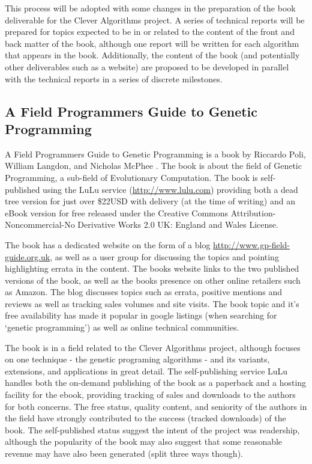 \documentclass[a4paper, 11pt]{article}
\begin{document}
This process will be adopted with some changes in the preparation of the book deliverable for the Clever Algorithms project. A series of technical reports will be prepared for topics expected to be in or related to the content of the front and back matter of the book, although one report will be written for each algorithm that appears in the book. Additionally, the content of the book (and potentially other deliverables such as a website) are proposed to be developed in parallel with the technical reports in a series of discrete milestones. 
 

% 
% 
\subsection{A Field Programmers Guide to Genetic Programming}
A Field Programmers Guide to Genetic Programming is a book by Riccardo Poli, William Langdon, and Nicholas McPhee \cite{Poli2008}. The book is about the field of Genetic Programming, a sub-field of Evolutionary Computation. The book is self-published using the LuLu service (\url{http://www.lulu.com}) providing both a dead tree version for just over \$22USD with delivery (at the time of writing) and an eBook version for free released under the Creative Commons Attribution-Noncommercial-No Derivative Works 2.0 UK: England and Wales License.

The book has a dedicated website on the form of a blog \url{http://www.gp-field-guide.org.uk}, as well as a user group for discussing the topics and pointing highlighting errata in the content. The books website links to the two published versions of the book, as well as the books presence on other online retailers such as Amazon. The blog discusses topics such as errata, positive mentions and reviews as well as tracking sales volumes and site visits. The book topic and it's free availability has made it popular in google listings (when searching for `genetic programming') as well as online technical communities. 

The book is in a field related to the Clever Algorithms project, although focuses on one technique - the genetic programing algorithms - and its variants, extensions, and applications in great detail. The self-publishing service LuLu handles both the on-demand publishing of the book as a paperback and a hosting facility for the ebook, providing tracking of sales and downloads to the authors for both concerns. The free status, quality content, and seniority of the authors in the field have strongly contributed to the success (tracked downloads) of the book. The self-published status suggest the intent of the project was readership, although the popularity of the book may also suggest that some reasonable revenue may have also been generated (split three ways though). 
\end{document}

